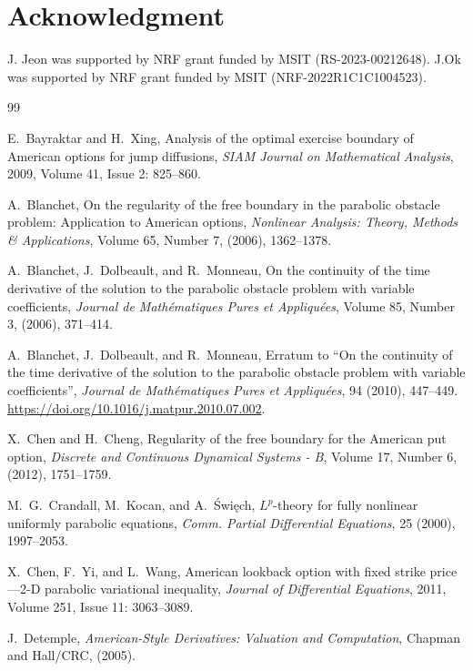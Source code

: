 \documentclass[11pt, a4paper, leqno]{amsart}
\numberwithin{equation}{section}
\theoremstyle{plain}
\theoremstyle{definition}
\theoremstyle{remark}
\begin{document}
\section*{Acknowledgment}
J. Jeon was supported by NRF grant funded by MSIT (RS-2023-00212648). J.Ok was supported by NRF grant funded by MSIT (NRF-2022R1C1C1004523).



\begin{thebibliography}{99}
	
	E.~Bayraktar and H.~Xing, Analysis of the optimal exercise boundary of American options for jump diffusions, \textit{SIAM Journal on Mathematical Analysis}, 2009, Volume 41, Issue 2: 825--860.
	
	A.~Blanchet, On the regularity of the free boundary in the parabolic obstacle problem: Application to American options, \textit{Nonlinear Analysis: Theory, Methods \& Applications}, Volume 65, Number 7, (2006), 1362--1378.
	
	A.~Blanchet, J.~Dolbeault, and R.~Monneau, On the continuity of the time derivative of the solution to the parabolic obstacle problem with variable coefficients, \textit{Journal de Math\'ematiques Pures et Appliqu\'ees}, Volume 85, Number 3, (2006), 371--414.
	
 {A.~Blanchet, J.~Dolbeault, and R.~Monneau,
 Erratum to ``On the continuity of the time derivative of the solution
 to the parabolic obstacle problem with variable coefficients'',
 \textit{Journal de Math\'ematiques Pures et Appliqu\'ees},
 94 (2010), 447--449. \url{https://doi.org/10.1016/j.matpur.2010.07.002}.}

	X.~Chen and H.~Cheng, Regularity of the free boundary for the American put option, \textit{Discrete and Continuous Dynamical Systems - B}, Volume 17, Number 6, (2012), 1751--1759.
	
{
M.~G.~Crandall, M.~Kocan, and A.~\'Swi\k{e}ch,
$L^p$-theory for fully nonlinear uniformly parabolic equations,
\textit{Comm. Partial Differential Equations},
25 (2000), 1997--2053.}

	X.~Chen, F.~Yi, and L.~Wang, American lookback option with fixed strike price---2-D parabolic variational inequality, \textit{Journal of Differential Equations}, 2011, Volume 251, Issue 11: 3063--3089.
	
	J.~Detemple, \textit{American-Style Derivatives: Valuation and Computation}, Chapman and Hall/CRC, (2005).
	

\end{thebibliography}
\end{document}
